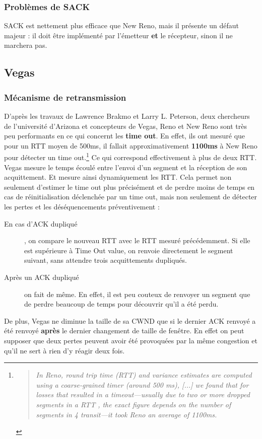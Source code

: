 \documentclass[	DIV=calc,%
							paper=a4,%
							fontsize=11pt,%
							twocolumn]{scrartcl}	 					%
\begin{document}
\subsubsection*{Problèmes de SACK}
SACK est nettement plus efficace que New Reno, mais il présente un défaut majeur : il doit être implémenté par l'émetteur \textbf{et} le récepteur, sinon il ne marchera pas.
\subsection*{Vegas}
\subsubsection*{Mécanisme de retransmission}
D'après les travaux de Lawrence Brakmo et Larry L. Peterson, deux chercheurs de l'université d'Arizona et concepteurs de Vegas, Reno et New Reno sont très peu performants en ce qui concernt les \textbf{time out}. En effet, ils ont mesuré que pour un RTT moyen de 500ms, il fallait approximativement \textbf{1100ms} à New Reno pour détecter un time out.\footnote{\begin{quote}\textit{In Reno, round trip time (RTT) and variance estimates are computed using a coarse-grained timer (around 500 ms), [...] we found that for losses that resulted in a timeout—usually due to two or more dropped segments in a RTT , the exact figure depends on the number of segments in 4 transit—it took Reno an average of 1100ms.}\end{quote}} Ce qui correspond effectivement à plus de deux RTT. Vegas mesure le temps écoulé entre l'envoi d'un segment et la réception de son acquittement. Et mesure ainsi dynamiquement les RTT.
Cela permet non seulement d'estimer le time out plus précisément et de perdre moins de temps en cas de réinitialisation déclenchée par un time out, mais non seulement de détecter les pertes et les déséquencements préventivement :
\begin{description}
	\item[En cas d'ACK dupliqué]{, on compare le nouveau RTT avec le RTT mesuré précédemment. Si elle est supérieure à Time Out value, on renvoie directement le segment suivant, sans attendre trois acquittements dupliqués.}
	\item[Après un ACK dupliqué]{on fait de même. En effet, il est peu couteux de renvoyer un segment que de perdre beaucoup de temps pour découvrir qu'il a été perdu. }
\end{description}
De plus, Vegas ne diminue la taille de sa CWND que si le dernier ACK renvoyé a été renvoyé \textbf{après} le dernier changement de taille de fenêtre. En effet on peut supposer que deux pertes peuvent avoir été provoquées par la même congestion et qu'il ne sert à rien d'y réagir deux fois.
\end{document}
